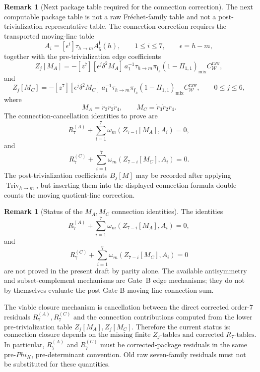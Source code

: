 \documentclass[11pt,a4paper]{amsart}
\def\Phi{Phi}%
\theoremstyle{plain}
\theoremstyle{definition}
\newtheorem{remark}[theorem]{Remark}
\begin{document}
\begin{remark}[Next package table required for the connection correction]
\label{rem:next-package-table-connection-correction}
The next computable package table is not a raw Fr\'echet-family table and
not a post-trivialization representative table.  The connection correction
requires the transported moving-line table
\[
A_i=[\epsilon^i]\tau_{h\to m}A_5^{\mathfrak f}(h),
\qquad
1\le i\le7,
\qquad
\epsilon=h-m,
\]
together with the pre-trivialization edge coefficients
\[
Z_j[M_A]
=
-[z^7][\epsilon^j\delta^2M_A]\,
a_1^{-1}\tau_{h\to m}
\pi_{\mathfrak f_h}
(1-\Pi_{1,1})_{\mathrm{mix}}C_{\mathcal W}^{\mathrm{raw}},
\]
and
\[
Z_j[M_C]
=
-[z^7][\epsilon^j\delta^2M_C]\,
a_1^{-1}\tau_{h\to m}
\pi_{\mathfrak f_h}
(1-\Pi_{1,1})_{\mathrm{mix}}C_{\mathcal W}^{\mathrm{raw}},
\qquad
0\le j\le6,
\]
where
\[
M_A=\dot r_3r_2\dot r_4,
\qquad
M_C=\dot r_3\dot r_2r_4.
\]
The connection-cancellation identities to prove are
\[
R_7^{(A)}
+
\sum_{i=1}^{7}
\omega_m(Z_{7-i}[M_A],A_i)=0,
\]
and
\[
R_7^{(C)}
+
\sum_{i=1}^{7}
\omega_m(Z_{7-i}[M_C],A_i)=0.
\]
The post-trivialization coefficients \(B_j[M]\) may be recorded after
applying \(\operatorname{Triv}_{h\to m}\), but inserting them into the
displayed connection formula double-counts the moving quotient-line
correction.
\end{remark}

\begin{remark}[Status of the \(M_A,M_C\) connection identities]
\label{rem:status-ma-mc-connection-identities}
The identities
\[
R_7^{(A)}
+
\sum_{i=1}^{7}\omega_m(Z_{7-i}[M_A],A_i)=0,
\]
and
\[
R_7^{(C)}
+
\sum_{i=1}^{7}\omega_m(Z_{7-i}[M_C],A_i)=0
\]
are not proved in the present draft by parity alone.  The available
antisymmetry and subset-complement mechanisms are Gate~B edge mechanisms;
they do not by themselves evaluate the post-Gate-B moving-line connection
sum.

The viable closure mechanism is cancellation between the direct corrected
order-\(7\) residuals \(R_7^{(A)},R_7^{(C)}\) and the connection
contributions computed from the lower pre-trivialization table
\(Z_j[M_A],Z_j[M_C]\).  Therefore the current status is:
\[
\boxed{
\text{connection closure depends on the missing finite }Z_j\text{-tables
and corrected }R_7\text{-tables.}
}
\]
In particular, \(R_7^{(A)}\) and \(R_7^{(C)}\) must be corrected-package
residuals in the same pre-\(\Phi_K\), pre-determinant convention.  Old raw
seven-family residuals must not be substituted for these quantities.
\end{remark}
\end{document}
